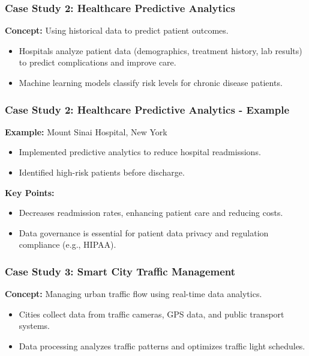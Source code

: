 \documentclass{beamer}
\begin{document}
\begin{frame}[fragile]
    \frametitle{Case Study 2: Healthcare Predictive Analytics}
    \textbf{Concept:} Using historical data to predict patient outcomes.

    \begin{itemize}
        \item Hospitals analyze patient data (demographics, treatment history, lab results) to predict complications and improve care.
        \item Machine learning models classify risk levels for chronic disease patients.
    \end{itemize}
\end{frame}

\begin{frame}[fragile]
    \frametitle{Case Study 2: Healthcare Predictive Analytics - Example}
    \textbf{Example:} Mount Sinai Hospital, New York 

    \begin{itemize}
        \item Implemented predictive analytics to reduce hospital readmissions.
        \item Identified high-risk patients before discharge.
    \end{itemize}

    \textbf{Key Points:}
    \begin{itemize}
        \item Decreases readmission rates, enhancing patient care and reducing costs.
        \item Data governance is essential for patient data privacy and regulation compliance (e.g., HIPAA).
    \end{itemize}
\end{frame}

\begin{frame}[fragile]
    \frametitle{Case Study 3: Smart City Traffic Management}
    \textbf{Concept:} Managing urban traffic flow using real-time data analytics.

    \begin{itemize}
        \item Cities collect data from traffic cameras, GPS data, and public transport systems.
        \item Data processing analyzes traffic patterns and optimizes traffic light schedules.
    \end{itemize}
\end{frame}
\end{document}
